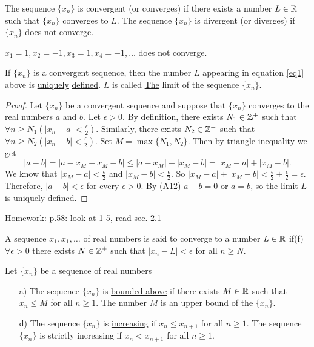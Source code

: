 \documentclass[]{article}
\begin{document}
\begin{definition}
	The sequence $\{x_n\}$ is convergent (or converges) if there exists a number $L\in \mathbb{R}$ such that $\{x_n\}$ converges to $L$. The sequence $\{x_n\}$ is divergent (or diverges) if $\{x_n\}$ does not converge.
\end{definition}
\begin{example}
	$x_1=1,x_2=-1,x_3=1,x_4=-1,\dots$ does not converge.
\end{example}

\begin{theorem}
	If $\{x_n\}$ is a convergent sequence, then the number $L$ appearing in equation \ref{eq1} above is \ul{uniquely} \ul{defined}. $L$ is called \ul{The} limit of the sequence $\{x_n\}$.
\end{theorem}
\begin{proof}
	Let $\{x_n\}$ be a convergent sequence and suppose that $\{x_n\}$ converges to the real numbers $a$ and $b$. Let $\epsilon>0$. By definition, there exists $N_1\in\mathbb{Z}^+$ such that $\forall n\geq N_1 (|x_n -a|< \frac{\epsilon}{2})$. Similarly, there exists $N_2\in \mathbb{Z}^+$ such that $\forall n\geq N_2 (|x_n-b|<\frac{\epsilon}{2})$. Set $M = \max{\{N_1,N_2\}}$. Then by triangle inequality we get $$|a-b|=|a-x_M + x_M -b| \leq |a-x_M|+|x_M-b| = |x_M-a|+|x_M-b|.$$
	We know that $|x_M-a|<\frac{\epsilon}{2}$ and $|x_M-b|<\frac{\epsilon}{2}$. So $|x_M-a|+|x_M-b|<\frac{\epsilon}{2} + \frac{\epsilon}{2} = \epsilon$. Therefore, $|a-b|<\epsilon$ for every $\epsilon>0$. By (A12) $a-b=0$ or $a=b$, so the limit $L$ is uniquely defined.
\end{proof}

Homework: p.58: look at 1-5, read sec. 2.1

\begin{definition}
	A sequence $x_1,x_1,\dots$ of real numbers is said to converge to a number $L\in\mathbb{R}$ if(f) $\forall\epsilon>0$ there exists $N\in\mathbb{Z}^+$ such that $|x_n-L|<\epsilon$ for all $n\geq N$.
\end{definition}
\newpage
\begin{definition}
	Let $\{x_n\} $ be a sequence of real numbers
	\begin{enumerate}
		\item[a)] The sequence $\{x_n\}$ is \ul{bounded above} if there exists $M\in\mathbb{R}$ such that $x_n\leq M$ for all $n\geq 1$. The number $M$ is an upper bound of the $\{x_n\}$. 
		\item[d)] The sequence $\{x_n\}$ is \ul{increasing} if $x_n\leq x_{n+1}$ for all $n\geq 1$. The sequence $\{x_n\}$ is strictly increasing if $x_n< x_{n+1}$ for all $n\geq 1$.
	\end{enumerate}
\end{definition}
\end{document}
